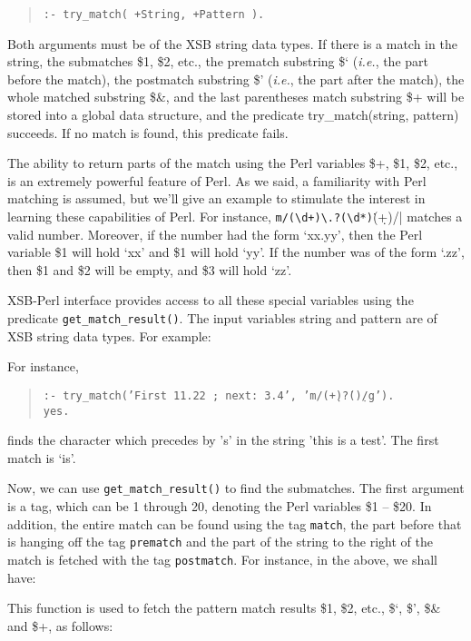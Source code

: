 \begin{quote}
 {\tt   :- try\_match( +String, +Pattern ). }
\end{quote}

Both arguments must be of the XSB string data types.  If there is a match
in the string, the submatches {\$}1, {\$}2, etc., the prematch substring
{\$}` ({\it i.e.}, the part before the match), the postmatch substring
{\$}' ({\it i.e.}, the part after the match), the whole matched substring
{\$}{\&}, and the last parentheses match substring {\$}+ will be stored
into a global data structure, and the predicate try\_match(string, pattern)
succeeds. If no match is found, this predicate fails.

The ability to return parts of the match using the Perl variables {\$}+,
{\$}1, {\$}2, etc., is an extremely powerful feature of Perl.
As we said, a familiarity with Perl matching is assumed, but we'll give an
example to stimulate the interest in learning these capabilities of Perl.
For instance, \verb|m/(\d+)\.?(\d*)|\.(\d+)/| matches a valid
number. Moreover, if the number had the form `xx.yy', then the Perl variable
\$1 will hold `xx' and \$1 will hold `yy'. If the number was of the form
`.zz', then \$1 and \$2 will be empty, and \$3 will hold `zz'.

XSB-Perl interface provides access to all these special variables using the
predicate {\tt get\_match\_result()}.
The input variables string
and pattern are of XSB string data types. For example:

For instance,
\begin{quote}
 {\tt :- try\_match('First 11.22 ; next: 3.4', 'm/(\d+)\.?(\d*)/g'). }\\
 {\tt yes.}  
\end{quote}
finds the character which precedes by 's' in the string 'this is a
test'. The first match is `is'.

Now, we can use {\tt get\_match\_result()} to find the submatches.  The
first argument is a tag, which can be 1 through 20, denoting the Perl
variables \$1 -- \$20. In addition, the entire match can be found using the
tag {\tt match}, the part before that is hanging off the tag {\tt prematch}
and the part of the string to the right of the match is fetched with the
tag {\tt postmatch}. For instance, in the above, we shall have: 

This function is used to fetch the pattern match results {\$}1, {\$}2, etc.,
{\$}`, {\$}', {\$}{\&} and {\$}+, as follows:

